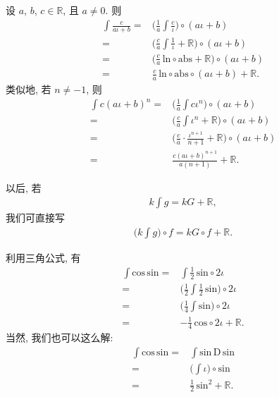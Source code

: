 \begin{example}
    设 $a$, $b$, $c \in \mathbb{R}$, 且 $a \neq 0$.
    则
    \begin{align*}
        \int {\frac{c}{a\iota + b}}
        = {} & \Bigg( \frac{1}{a} \int {\frac{c}{\iota}} \Bigg) \circ (a\iota + b)                       \\
        = {} & \Bigg( \frac{c}{a} \int {\frac{1}{\iota}} + \mathbb{R} \Bigg) \circ (a\iota + b)          \\
        = {} & \Bigg( \frac{c}{a}\,\mathrm{ln} \circ \mathrm{abs} + \mathbb{R} \Bigg) \circ (a\iota + b) \\
        = {} & \frac{c}{a}\, \mathrm{ln} \circ \mathrm{abs} \circ (a\iota + b) + \mathbb{R}.
    \end{align*}
    类似地, 若 $n \neq -1$, 则
    \begin{align*}
        \int {c(a\iota + b)^n}
        = {} & \Bigg( \frac{1}{a} \int {c\iota^n} \Bigg) \circ (a\iota + b)                                \\
        = {} & \Bigg( \frac{c}{a} \int {\iota^n} + \mathbb{R} \Bigg) \circ (a\iota + b)                    \\
        = {} & \Bigg( \frac{c}{a} \cdot \frac{\iota^{n + 1}}{n + 1} + \mathbb{R} \Bigg) \circ (a\iota + b) \\
        = {} & \frac{c(a\iota + b)^{n + 1}}{a(n + 1)} + \mathbb{R}.
    \end{align*}
\end{example}

\begin{remark}
    以后, 若
    \begin{align*}
        k\int {g} = kG + \mathbb{R},
    \end{align*}
    我们可直接写
    \begin{align*}
        \Bigg( k\int {g} \Bigg) \circ f = kG \circ f + \mathbb{R}.
    \end{align*}
\end{remark}

\begin{example}
    利用三角公式, 有
    \begin{align*}
        \int {\mathrm{cos}\,\mathrm{sin}}
        = {} & \int {\frac{1}{2}\, \mathrm{sin} \circ {2\iota}}                           \\
        = {} & \Bigg( \frac{1}{2} \int {\frac{1}{2}\, \mathrm{sin}} \Bigg) \circ {2\iota} \\
        = {} & \Bigg( \frac{1}{4} \int {\mathrm{sin}} \Bigg) \circ {2\iota}               \\
        = {} & {-\frac{1}{4}}\, \mathrm{cos} \circ {2\iota} + \mathbb{R}.
    \end{align*}
    当然, 我们也可以这么解:
    \begin{align*}
        \int {\mathrm{cos}\,\mathrm{sin}}
        = {} & \int {\mathrm{sin}\, \mathrm{D}\,\mathrm{sin}} \\
        = {} & \Bigg( \int {\iota} \Bigg) \circ \mathrm{sin}  \\
        = {} & \frac{1}{2}\, \mathrm{sin}^2 + \mathbb{R}.
    \end{align*}
\end{example}

